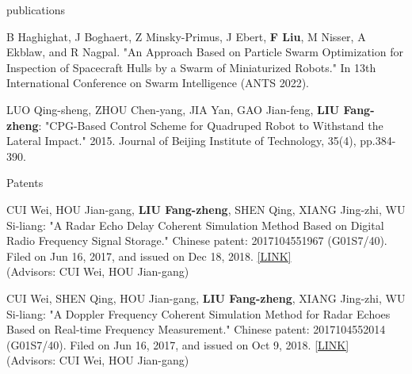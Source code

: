 \documentclass{resume} %
\begin{document}
\begin{rSection}{publications}
\begin{itemlabel}
\item B Haghighat, J Boghaert, Z Minsky-Primus, J Ebert, \textbf{F Liu}, M Nisser, A Ekblaw, and R Nagpal.
"An Approach Based on Particle Swarm Optimization for Inspection of Spacecraft Hulls by a Swarm of Miniaturized Robots."
In 13th International Conference on Swarm Intelligence (ANTS 2022).
\smallskip
\smallskip
\smallskip

\item LUO Qing-sheng, ZHOU Chen-yang, JIA Yan, GAO Jian-feng, \textbf{LIU Fang-zheng}:
"CPG-Based Control Scheme for Quadruped Robot to Withstand the Lateral Impact."
2015. Journal of Beijing Institute of Technology, 35(4), pp.384-390.
\end{itemlabel}
\end{rSection}

%
\begin{rSection}{Patents}

\begin{itemlabel}
\item CUI Wei, HOU Jian-gang, \textbf{LIU Fang-zheng}, SHEN Qing, XIANG Jing-zhi, WU Si-liang: "A Radar Echo Delay Coherent Simulation Method Based on Digital Radio Frequency Signal Storage." Chinese patent: 2017104551967 (G01S7/40). Filed on Jun 16, 2017, and issued on Dec 18, 2018. \href{http://www.zlqiao.com/zlqiao/patent-f0301af6125548659bae9e05ed9543d6.html}{[LINK]}\\
(Advisors: CUI Wei, HOU Jian-gang)
\smallskip
\smallskip
\smallskip
\item CUI Wei, SHEN Qing, HOU Jian-gang, \textbf{LIU Fang-zheng}, XIANG Jing-zhi, WU Si-liang: "A Doppler Frequency Coherent Simulation Method for Radar Echoes Based on Real-time Frequency Measurement." Chinese patent: 2017104552014 (G01S7/40). Filed on Jun 16, 2017, and issued on Oct 9, 2018. \href{http://www.zlqiao.com/zlqiao/patent-4dc7dd85795d40a08320e507561834ca.html}{[LINK]}\\
(Advisors: CUI Wei, HOU Jian-gang)
\end{itemlabel}
\end{rSection}

%

\end{document}
